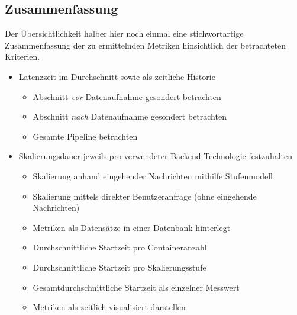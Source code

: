 \subsection{Zusammenfassung \checkmark}
Der Übersichtlichkeit halber hier noch einmal eine stichwortartige Zusammenfassung der zu ermittelnden Metriken hinsichtlich der betrachteten Kriterien.

\begin{itemize}
  \item Latenzzeit im Durchschnitt sowie als zeitliche Historie
  \begin{itemize}
    \item Abschnitt \emph{vor} Datenaufnahme gesondert betrachten
    \item Abschnitt \emph{nach} Datenaufnahme gesondert betrachten
    \item Gesamte Pipeline betrachten
  \end{itemize}
  \item Skalierungsdauer jeweils pro verwendeter Backend-Technologie festzuhalten
  \begin{itemize}
    \item Skalierung anhand eingehender Nachrichten mithilfe Stufenmodell
    \item Skalierung mittels direkter Benutzeranfrage (ohne eingehende Nachrichten)
    \item Metriken als Datensätze in einer Datenbank hinterlegt
    \item Durchschnittliche Startzeit pro Containeranzahl 
    \item Durchschnittliche Startzeit pro Skalierungsstufe 
    \item Gesamtdurchschnittliche Startzeit als einzelner Messwert
    \item Metriken als zeitlich visualisiert darstellen
  \end{itemize}
\end{itemize}